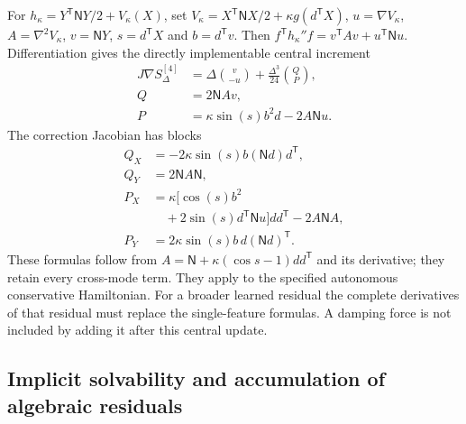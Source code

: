 For $h_\kappa=Y^{\mathsf T}\mathsf N Y/2+V_\kappa(X)$, set
$V_\kappa=X^{\mathsf T}\mathsf N X/2+\kappa g(d^{\mathsf T}X)$,
$u=\nabla V_\kappa$, $A=\nabla^2V_\kappa$, $v=\mathsf N Y$,
$s=d^{\mathsf T}X$ and $b=d^{\mathsf T}v$. Then
$f^{\mathsf T}h_\kappa''f=v^{\mathsf T}Av+u^{\mathsf T}\mathsf N u$.
Differentiation gives the directly implementable central increment
\begin{equation}\label{ss:central4-magnetic}
\begin{aligned}
 J\nabla S_\Delta^{[4]}
 &=\Delta\binom{v}{-u}+\frac{\Delta^3}{24}\binom{Q}{P},\\
 Q&=2\mathsf N A v,\\
 P&=\kappa\sin(s)b^2d-2A\mathsf N u.
\end{aligned}
\end{equation}
The correction Jacobian has blocks
\begin{equation}\label{ss:central4-magnetic-jacobian}
\begin{aligned}
 Q_X&=-2\kappa\sin(s)b(\mathsf N d)d^{\mathsf T},\\
 Q_Y&=2\mathsf N A\mathsf N,\\
 P_X&=\kappa[\cos(s)b^2\\
    &\quad+2\sin(s)d^{\mathsf T}\mathsf N u]dd^{\mathsf T}-2A\mathsf N A,\\
 P_Y&=2\kappa\sin(s)b\,d(\mathsf N d)^{\mathsf T}.
\end{aligned}
\end{equation}
These formulas follow from
$A=\mathsf N+\kappa(\cos s-1)dd^{\mathsf T}$ and its derivative; they retain every cross-mode term. They apply to the specified autonomous conservative Hamiltonian. For a broader learned residual the complete derivatives of that residual must replace the single-feature formulas. A damping force is not included by adding it after this central update.

\subsection{Implicit solvability and accumulation of algebraic residuals}
\label{ss:inexact-solve}

